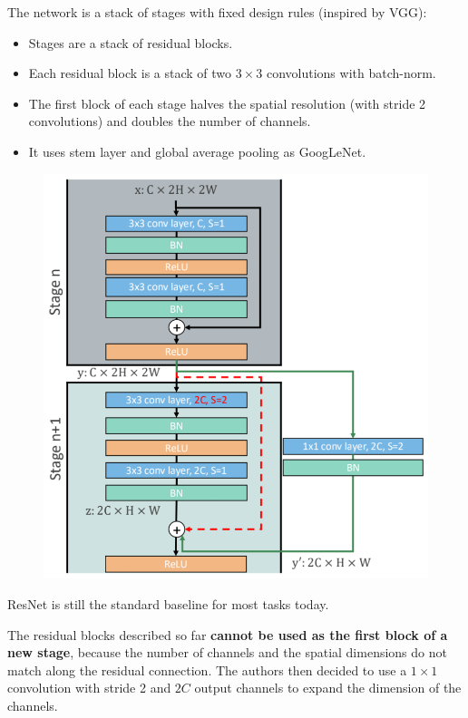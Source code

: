 The network is a stack of stages with fixed design rules (inspired by VGG):
\begin{itemize}
  \item Stages are a stack of residual blocks.
  \item Each residual block is a stack of two $3 \times 3$ convolutions with batch-norm.
  \item The first block of each stage halves the spatial resolution (with stride 2 convolutions) and doubles the number of channels.
  \item It uses stem layer and global average pooling as GoogLeNet.
\end{itemize}

\begin{figure}[htbp]
  \centering
  \includegraphics[width=0.8\linewidth]{./img/resnet_skip.png}
\end{figure}

ResNet is still the standard baseline for most tasks today.

The residual blocks described so far \textbf{cannot be used as the first block of a new stage}, because the number of channels and the spatial dimensions do not match along the residual connection.
The authors then decided to use a $1\times 1$ convolution with stride 2 and $2C$ output channels to expand the dimension of the channels.


